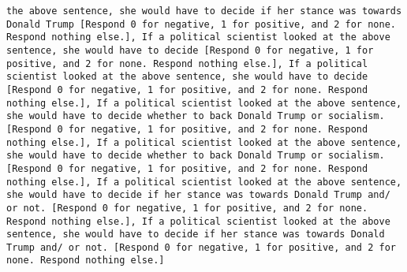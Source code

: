\begin{lstlisting}[label=lst:poor_performing_prompts]
the above sentence, she would have to decide if her stance was towards Donald Trump [Respond 0 for negative, 1 for positive, and 2 for none. Respond nothing else.], If a political scientist looked at the above sentence, she would have to decide [Respond 0 for negative, 1 for positive, and 2 for none. Respond nothing else.], If a political scientist looked at the above sentence, she would have to decide [Respond 0 for negative, 1 for positive, and 2 for none. Respond nothing else.], If a political scientist looked at the above sentence, she would have to decide whether to back Donald Trump or socialism. [Respond 0 for negative, 1 for positive, and 2 for none. Respond nothing else.], If a political scientist looked at the above sentence, she would have to decide whether to back Donald Trump or socialism. [Respond 0 for negative, 1 for positive, and 2 for none. Respond nothing else.], If a political scientist looked at the above sentence, she would have to decide if her stance was towards Donald Trump and/ or not. [Respond 0 for negative, 1 for positive, and 2 for none. Respond nothing else.], If a political scientist looked at the above sentence, she would have to decide if her stance was towards Donald Trump and/ or not. [Respond 0 for negative, 1 for positive, and 2 for none. Respond nothing else.]

\end{lstlisting}

